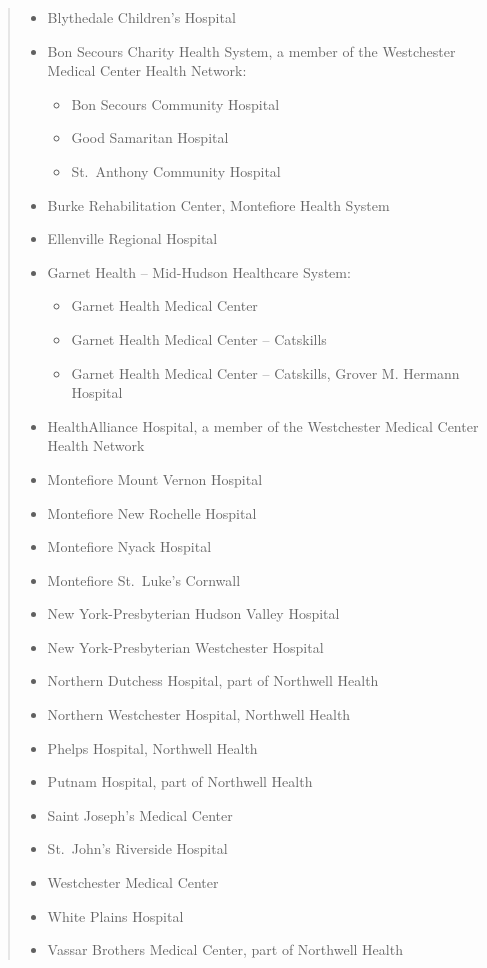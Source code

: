 \documentclass[
  english,
  letterpaper,
]{report}
\providecommand{\tightlist}{%
  \setlength{\itemsep}{0pt}\setlength{\parskip}{0pt}}
\begin{document}
\begin{quote}
\begin{itemize}
\tightlist
\item
  Blythedale Children's Hospital
\item
  Bon Secours Charity Health System, a member of the Westchester Medical
  Center Health Network:

  \begin{itemize}
  \tightlist
  \item
    Bon Secours Community Hospital
  \item
    Good Samaritan Hospital
  \item
    St.~Anthony Community Hospital
  \end{itemize}
\item
  Burke Rehabilitation Center, Montefiore Health System
\item
  Ellenville Regional Hospital
\item
  Garnet Health -- Mid-Hudson Healthcare System:

  \begin{itemize}
  \tightlist
  \item
    Garnet Health Medical Center
  \item
    Garnet Health Medical Center -- Catskills
  \item
    Garnet Health Medical Center -- Catskills, Grover M. Hermann
    Hospital
  \end{itemize}
\item
  HealthAlliance Hospital, a member of the Westchester Medical Center
  Health Network
\item
  Montefiore Mount Vernon Hospital
\item
  Montefiore New Rochelle Hospital
\item
  Montefiore Nyack Hospital
\item
  Montefiore St.~Luke's Cornwall
\item
  New York-Presbyterian Hudson Valley Hospital
\item
  New York-Presbyterian Westchester Hospital
\item
  Northern Dutchess Hospital, part of Northwell Health
\item
  Northern Westchester Hospital, Northwell Health
\item
  Phelps Hospital, Northwell Health
\item
  Putnam Hospital, part of Northwell Health
\item
  Saint Joseph's Medical Center
\item
  St.~John's Riverside Hospital
\item
  Westchester Medical Center
\item
  White Plains Hospital
\item
  Vassar Brothers Medical Center, part of Northwell Health
\end{itemize}
\end{quote}
\end{document}
